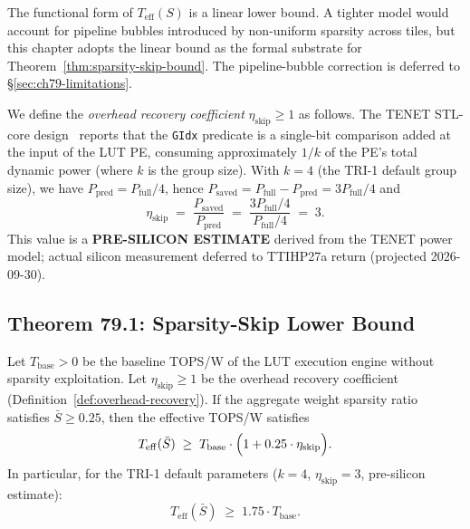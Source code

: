\begin{remark}
The functional form of $T_{\mathrm{eff}}(S)$ is a linear lower bound.
A tighter model would account for pipeline bubbles introduced by
non-uniform sparsity across tiles, but this chapter adopts the linear
bound as the formal substrate for Theorem~\ref{thm:sparsity-skip-bound}.
The pipeline-bubble correction is deferred to §\ref{sec:ch79-limitations}.
\end{remark}

\begin{definition}
\label{def:overhead-recovery}
We define the \emph{overhead recovery coefficient}
$\eta_{\mathrm{skip}} \geq 1$ as follows.
The TENET STL-core design~\cite{huang2025tenet} reports that the
\texttt{GIdx} predicate is a single-bit comparison added at the input
of the LUT PE, consuming approximately $1/k$ of the PE's total dynamic
power (where $k$ is the group size).
With $k = 4$ (the TRI-1 default group size), we have
$P_{\mathrm{pred}} = P_{\mathrm{full}}/4$,
hence $P_{\mathrm{saved}} = P_{\mathrm{full}} - P_{\mathrm{pred}}
= 3 P_{\mathrm{full}}/4$ and
\[
  \eta_{\mathrm{skip}} \;=\; \frac{P_{\mathrm{saved}}}{P_{\mathrm{pred}}}
    \;=\; \frac{3 P_{\mathrm{full}}/4}{P_{\mathrm{full}}/4} \;=\; 3.
\]
This value is a \textbf{PRE-SILICON ESTIMATE} derived from the
TENET power model; actual silicon measurement deferred to
TTIHP27a return (projected 2026-09-30).
\end{definition}

\subsection{Theorem 79.1: Sparsity-Skip Lower Bound}
\label{subsec:ch79-theorem-sparsity}

\begin{theorem}
\label{thm:sparsity-skip-bound}
Let $T_{\mathrm{base}} > 0$ be the baseline TOPS/W of the LUT execution
engine without sparsity exploitation.
Let $\eta_{\mathrm{skip}} \geq 1$ be the overhead recovery coefficient
(Definition~\ref{def:overhead-recovery}).
If the aggregate weight sparsity ratio satisfies $\bar{S} \geq 0.25$,
then the effective TOPS/W satisfies
\[
  T_{\mathrm{eff}}(\bar{S}) \;\geq\; T_{\mathrm{base}} \cdot
    \Bigl(1 + 0.25 \cdot \eta_{\mathrm{skip}}\Bigr).
\]
In particular, for the TRI-1 default parameters
($k = 4$, $\eta_{\mathrm{skip}} = 3$, pre-silicon estimate):
\[
  T_{\mathrm{eff}}(\bar{S}) \;\geq\; 1.75 \cdot T_{\mathrm{base}}.
\]
\end{theorem}

